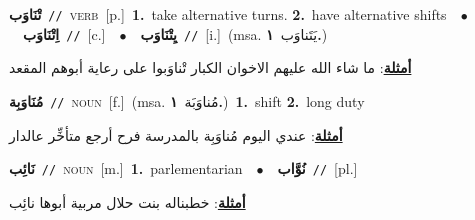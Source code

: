 \documentclass[10pt,a4paper,twoside]{article} %
\begin{document}
\begin{multicols}{2}
{\setlength\topsep{0pt}\textbf{\foreignlanguage{arabic}{تْنَاوَب}}\ {\color{gray}\texttt{//}\color{black}}\ \textsc{verb}\ [p.]\ \textbf{1.}~take alternative turns.  \textbf{2.}~have alternative shifts\ \ $\bullet$\ \ \setlength\topsep{0pt}\textbf{\foreignlanguage{arabic}{اِتْنَاوَب}}\ {\color{gray}\texttt{//}\color{black}}\ [c.]\ \ $\bullet$\ \ \setlength\topsep{0pt}\textbf{\foreignlanguage{arabic}{يِتْنَاوَب}}\ {\color{gray}\texttt{//}\color{black}}\ [i.]\ \color{gray}(msa. \foreignlanguage{arabic}{يَتَناوَب}~\foreignlanguage{arabic}{\textbf{١.}})\color{black}\  \begin{flushright}\color{gray}\foreignlanguage{arabic}{\textbf{\underline{\foreignlanguage{arabic}{أمثلة}}}: ما شاء الله عليهم الاخوان الكبار تْناوَبوا على رعاية أبوهم المقعد}\end{flushright}\color{black}} \vspace{2mm}

{\setlength\topsep{0pt}\textbf{\foreignlanguage{arabic}{مُنَاوَبِة}}\ {\color{gray}\texttt{//}\color{black}}\ \textsc{noun}\ [f.]\ \color{gray}(msa. \foreignlanguage{arabic}{مُناوَبَة}~\foreignlanguage{arabic}{\textbf{١.}})\color{black}\ \textbf{1.}~shift  \textbf{2.}~long duty\  \begin{flushright}\color{gray}\foreignlanguage{arabic}{\textbf{\underline{\foreignlanguage{arabic}{أمثلة}}}: عندي اليوم مُناوَبِة بالمدرسة فرح أرجع متأخِّر عالدار}\end{flushright}\color{black}} \vspace{2mm}

{\setlength\topsep{0pt}\textbf{\foreignlanguage{arabic}{نَائِب}}\ {\color{gray}\texttt{//}\color{black}}\ \textsc{noun}\ [m.]\ \textbf{1.}~parlementarian\ \ $\bullet$\ \ \setlength\topsep{0pt}\textbf{\foreignlanguage{arabic}{نُوَّاب}}\ {\color{gray}\texttt{//}\color{black}}\ [pl.]\  \begin{flushright}\color{gray}\foreignlanguage{arabic}{\textbf{\underline{\foreignlanguage{arabic}{أمثلة}}}: خطبناله بنت حلال مربية أبوها نائِب}\end{flushright}\color{black}} \vspace{2mm}


\end{multicols}
\end{document}
